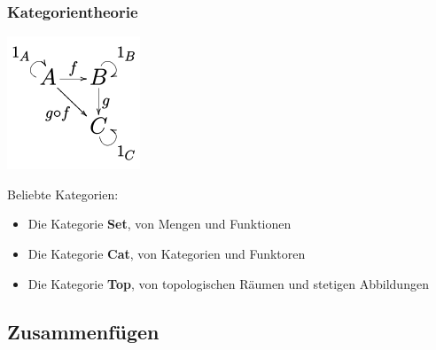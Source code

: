 \documentclass{beamer}
\begin{document}

\begin{frame}
\frametitle{Kategorientheorie}

\begin{multicols}{2}

\begin{center}
\includegraphics[scale=0.8]{150px-Category_SVG.png} 
\end{center}

\columnbreak
\pause

Beliebte Kategorien:\bigskip

\begin{itemize}
\pause\item Die Kategorie \textbf{Set}, von Mengen und Funktionen
\pause\item Die Kategorie \textbf{Cat}, von Kategorien und Funktoren
\pause\item Die Kategorie \textbf{Top}, von topologischen Räumen und stetigen Abbildungen
\end{itemize}

\end{multicols}

\end{frame}

\subsection*{Zusammenfügen}
\end{document}

